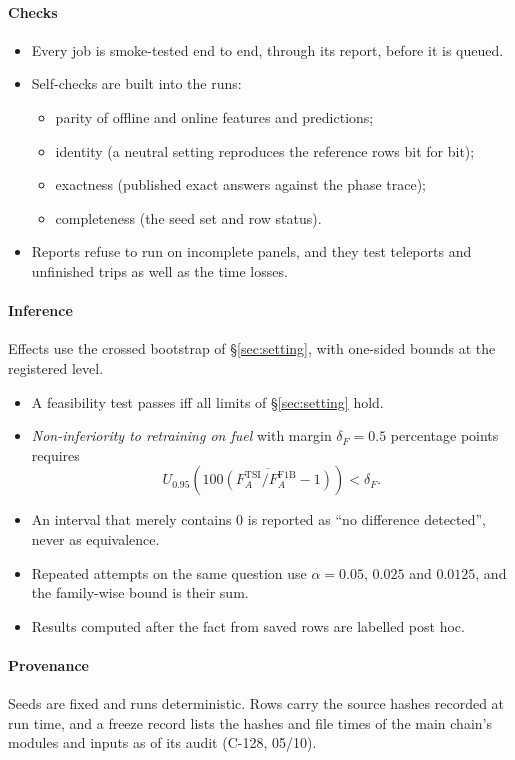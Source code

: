 \paragraph{Checks}
\begin{itemize}\setlength\itemsep{1pt}
\item Every job is smoke-tested end to end, through its report, before it is queued.
\item Self-checks are built into the runs:
\begin{itemize}\setlength\itemsep{0pt}
\item parity of offline and online features and predictions;
\item identity (a neutral setting reproduces the reference rows bit for bit);
\item exactness (published exact answers against the phase trace);
\item completeness (the seed set and row status).
\end{itemize}
\item Reports refuse to run on incomplete panels, and they test teleports and unfinished trips as well as the time losses.
\end{itemize}
\paragraph{Inference} Effects use the crossed bootstrap of §\ref{sec:setting}, with one-sided bounds at the registered level.
\begin{itemize}\setlength\itemsep{1pt}
\item A feasibility test passes iff all limits of §\ref{sec:setting} hold.
\item \emph{Non-inferiority to retraining on fuel} with margin $\delta_F=0.5$ percentage points requires
\begin{equation}
U_{0.95}\!\left(\overline{100(F_A^{\mathrm{TSI}}/F_A^{\mathrm{F1B}}-1)}\right)<\delta_F.
\end{equation}
\item An interval that merely contains 0 is reported as ``no difference detected'', never as equivalence.
\item Repeated attempts on the same question use $\alpha=0.05$, $0.025$ and $0.0125$, and the family-wise bound is their sum.
\item Results computed after the fact from saved rows are labelled post hoc.
\end{itemize}
\paragraph{Provenance} Seeds are fixed and runs deterministic. Rows carry the source hashes recorded at run time, and a freeze record lists
the hashes and file times of the main chain's modules and inputs as of its audit (C-128, 05/10).

